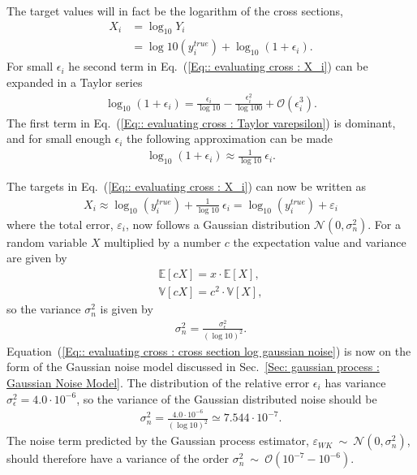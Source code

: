 \documentclass[twoside,english]{uiofysmaster}
\begin{document}
The target values will in fact be the logarithm of the cross sections, 
\begin{align}
X_i &= \log_{10} Y_i \nonumber \\
&= \log{10}(y_i^{true})  + \log_{10}(1 + \epsilon_i).\label{Eq:: evaluating cross : X_i}
\end{align}
For small $\epsilon_i$ he second term in Eq.~(\ref{Eq:: evaluating cross : X_i}) can be expanded in a Taylor series
\begin{align}\label{Eq:: evaluating cross : Taylor varepsilon}
\log_{10}(1 + \epsilon_i) = \frac{\epsilon_i}{\log 10} - \frac{\epsilon_i^2}{\log 100} + \mathcal{O}(\epsilon_i^3). 
\end{align} 
The first term in Eq.~(\ref{Eq:: evaluating cross : Taylor varepsilon}) is dominant, and for small enough $\epsilon_i$ the following approximation can be made
\begin{align}
\log_{10}(1 + \epsilon_i) \approx \frac{1}{\log 10} ~\epsilon_i.
\end{align}

The targets in Eq.~(\ref{Eq:: evaluating cross : X_i}) can now be written as
\begin{align}\label{Eq:: evaluating cross : cross section log gaussian noise}
X_i \approx \log_{10}(y_i^{true}) + \frac{1}{\log 10} ~\epsilon_i = \log_{10}(y_i^{true}) + \varepsilon_i 
\end{align}
where the total error, $\varepsilon_i$, now follows a Gaussian distribution $\mathcal{N}(0, \sigma_n^2)$. For a random variable $X$ multiplied by a number $c$ the expectation value and variance are given by
\begin{align}
\mathbb{E} [c X] = x \cdot \mathbb{E}[X],\\
\mathbb{V}[c X] = c^2 \cdot \mathbb{V}[X],
\end{align}
so the variance $\sigma_n^2$ is given by
\begin{align}
\sigma_n^2 = \frac{\sigma_{\epsilon}^2}{(\log 10)^2}.
\end{align}
Equation~(\ref{Eq:: evaluating cross : cross section log gaussian noise}) is now on the form of the Gaussian noise model discussed in Sec.~\ref{Sec: gaussian process : Gaussian Noise Model}. The distribution of the relative error $\epsilon_i$ has variance $\sigma_{\epsilon}^2 = 4.0 \cdot 10^{-6}$, so the variance of the Gaussian distributed noise should be
\begin{align*}
\sigma_n^2 =  \frac{4.0 \cdot 10^{-6}}{(\log 10)^2} \simeq 7.544 \cdot 10^{-7}.
\end{align*}
The noise term predicted by the Gaussian process estimator, $\varepsilon_{WK}~\sim~\mathcal{N}(0, \sigma_n^2)$, should therefore have a variance of the order $\sigma_n^2~\sim~\mathcal{O}(10^{-7}- 10^{-6})$.
\end{document}
